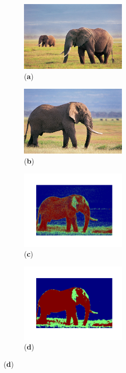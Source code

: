 \begin{figure}[H]
    \centering
    \begin{subfigure}{2.1in}
        \centering
        \includegraphics[width=2in]{./Images/elephant2.jpg}
        \caption{(\textbf{a})}
    \end{subfigure}
    \begin{subfigure}{2.1in}
        \centering
        \includegraphics[width=2in]{./Images/elephant1.jpg}
        \caption{(\textbf{b})}
    \end{subfigure}
    \begin{subfigure}{2.1in}
        \centering
        \includegraphics[width=2in]{./Images/2.png}
        \caption{(\textbf{c})}
    \end{subfigure}
    \newline
    \begin{subfigure}{2.1in}
        \centering
        \includegraphics[width=2in]{./Images/3.png}
        \caption{(\textbf{d})}
    \end{subfigure}

\end{figure}
